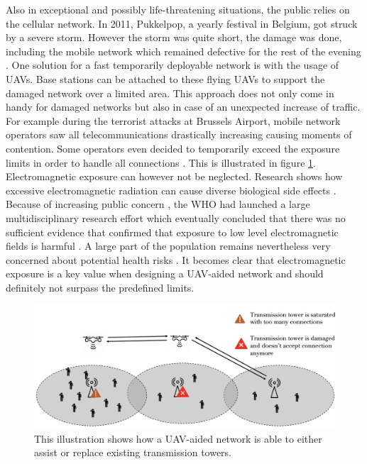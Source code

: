 Also in exceptional and possibly life-threatening situations, the public relies on the cellular network. 
In 2011, Pukkelpop, a yearly festival in Belgium, got struck by a severe storm. However the storm 
was quite short, the damage was done, including the mobile network which remained defective for the rest of the evening \cite{pukkelpop}.
One solution for a fast temporarily deployable network is with the usage of \gls{UAV}s. Base stations can be attached to 
these flying \gls{UAV}s to support the damaged network over a limited area. 
This approach does not only come in handy for 
damaged networks but also in case of an unexpected increase of traffic. 
For example during the terrorist attacks at Brussels Airport,
mobile network operators saw all telecommunications drastically increasing causing moments of contention. 
Some operators even decided to temporarily exceed the exposure limits in
order to handle all connections \cite{baseZaventem}.
This is illustrated in figure \ref{fig:networkIllustrationDamagedNetwork}.
Electromagnetic exposure can however not be neglected. Research shows how excessive electromagnetic radiation can cause diverse biological side effects \cite{J31_bioeffects}.
Because of increasing public concern \cite{J31_bioeffects}, the \gls{WHO} had launched a large multidisciplinary research effort which eventually concluded that there was no sufficient evidence that confirmed 
that exposure to low level electromagnetic fields is harmful \cite{WHO}. 
A large part of the population remains nevertheless very concerned about potential health risks \cite{bloomberg5G}.
It becomes clear that electromagnetic exposure is a key value when designing a \gls{UAV}-aided network and should definitely 
not surpass the predefined limits.

\begin{figure}[H]
\centering
  \includegraphics[width=\textwidth]{../images/networkIllustrationDamagedNetwork.png}
  \caption{This illustration shows how a UAV-aided network is able to either assist or replace 
  existing transmission towers.}
  \label{fig:networkIllustrationDamagedNetwork}
\end{figure}

